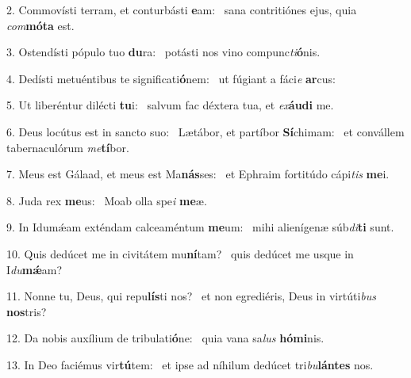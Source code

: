 2. Commovísti terram, et conturbásti \textbf{e}am: \ast\  sana contritiónes ejus, quia \textit{com}\textbf{mó}\textbf{ta} est.\

3. Ostendísti pópulo tuo \textbf{du}ra: \ast\  potásti nos vino compunc\textit{ti}\textbf{ó}nis.\

4. Dedísti metuéntibus te significati\textbf{ó}nem: \ast\  ut fúgiant a fáci\textit{e} \textbf{ar}cus:\

5. Ut liberéntur dilécti \textbf{tu}i: \ast\  salvum fac déxtera tua, et \textit{ex}\textbf{áu}\textbf{di} me.\

6. Deus locútus est in sancto suo: \dag\  Lætábor, et partíbor \textbf{Sí}chimam: \ast\  et convállem tabernaculórum \textit{me}\textbf{tí}bor.\

7. Meus est Gálaad, et meus est Ma\textbf{nás}ses: \ast\  et Ephraim fortitúdo cápi\textit{tis} \textbf{me}i.\

8. Juda rex \textbf{me}us: \ast\  Moab olla spe\textit{i} \textbf{me}æ.\

9. In Idumǽam exténdam calceaméntum \textbf{me}um: \ast\  mihi alienígenæ súb\textit{di}\textbf{ti} sunt.\

10. Quis dedúcet me in civitátem mu\textbf{ní}tam? \ast\  quis dedúcet me usque in I\textit{du}\textbf{mǽ}am?\

11. Nonne tu, Deus, qui repu\textbf{lís}ti nos? \ast\  et non egrediéris, Deus in virtúti\textit{bus} \textbf{nos}tris?\

12. Da nobis auxílium de tribulati\textbf{ó}ne: \ast\  quia vana sa\textit{lus} \textbf{hó}\textbf{mi}nis.\

13. In Deo faciémus vir\textbf{tú}tem: \ast\  et ipse ad níhilum dedúcet tri\textit{bu}\textbf{lán}\textbf{tes} nos.\

